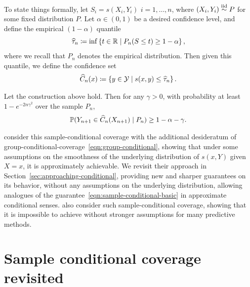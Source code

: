 \documentclass[11pt]{article}
\newcommand{\scorefunc}{s}
\newcommand{\scoreval}{\scorefunc}
\newcommand{\scorerv}{S}
\begin{document}
To state things formally, let $\scorerv_i = \scoreval(X_i, Y_i)$
$i = 1, \ldots, n$, where $(X_i, Y_i) \stackrel{\rm iid}{\sim} P$ for some
fixed distribution $P$. Let $\alpha \in (0, 1)$ be a desired
confidence level, and define the
empirical $(1 - \alpha)$ quantile
\begin{equation*}
  \what{\tau}_n \defeq \inf\left\{t \in \R \mid
  P_n(\scorerv \le t) \ge 1 - \alpha \right\},
\end{equation*}
where we recall that $P_n$ denotes the empirical distribution.
Then given this quantile, we define the confidence set
\begin{equation*}
  \what{C}_n(x) \defeq \left\{y \in \mc{Y} \mid \scorefunc(x, y)
  \le \what{\tau}_n \right\}.
\end{equation*}

\begin{proposition}
  \label{proposition:sample-conditional-basic}
  Let the construction above hold. Then for any $\gamma > 0$, with
  probability at least $1 - e^{-2n\gamma^2}$ over the sample $P_n$,
  \begin{equation}
    \mathbb{P}(Y_{n + 1} \in \widehat{C}_n(X_{n + 1}) \mid P_n) \ge 1 - \alpha - \gamma.
    \label{eqn:sample-conditional-basic}
  \end{equation}
\end{proposition}

\citet{JungNoRaRo23} consider this sample-conditional coverage with the
additional desideratum of
group-conditional-coverage~\eqref{eqn:group-conditional}, showing that under
some assumptions on the smoothness of the underlying distribution of
$\scoreval(x, Y)$ given $X = x$, it is approximately achievable.
%
We revisit their approach in Section~\ref{sec:approaching-conditional},
providing new and sharper guarantees on its behavior, without
any assumptions on the underlying distribution, allowing
analogues of the guarantee~\eqref{eqn:sample-conditional-basic}
in approximate conditional senses.
%
\citet{BianBa22} also consider such sample-conditional coverage, showing
that it is impossible to achieve without stronger assumptions for
many predictive methods. 

\section{Sample conditional coverage revisited}
\end{document}
